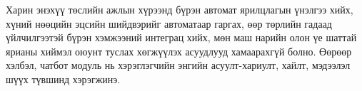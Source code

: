 \par{}Харин энэхүү төслийн ажлын хүрээнд бүрэн автомат ярилцлагын үнэлгээ хийх, хүний нөөцийн эцсийн шийдвэрийг автоматаар гаргах, өөр төрлийн гадаад үйлчилгээтэй бүрэн хэмжээний интеграц хийх, мөн маш нарийн олон үе шаттай ярианы хиймэл оюунт туслах хөгжүүлэх асуудлууд хамаарахгүй болно. Өөрөөр хэлбэл, чатбот модуль нь хэрэглэгчийн энгийн асуулт-хариулт, хайлт, мэдээлэл шүүх түвшинд хэрэгжинэ.